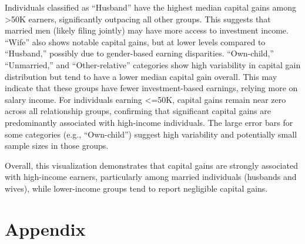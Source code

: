 \documentclass[journal,onecolumn]{IEEEtran}
\begin{document}
Individuals classified as “Husband” have the highest median capital gains among >50K earners, significantly outpacing all other groups. This suggests that married men (likely filing jointly) may have more access to investment income.
“Wife” also shows notable capital gains, but at lower levels compared to “Husband,” possibly due to gender-based earning disparities.
“Own-child,” “Unmarried,” and “Other-relative” categories show high variability in capital gain distribution but tend to have a lower median capital gain overall. This may indicate that these groups have fewer investment-based earnings, relying more on salary income.
For individuals earning <=50K, capital gains remain near zero across all relationship groups, confirming that significant capital gains are predominantly associated with high-income individuals.
The large error bars for some categories (e.g., “Own-child”) suggest high variability and potentially small sample sizes in those groups.

Overall, this visualization demonstrates that capital gains are strongly associated with high-income earners, particularly among married individuals (husbands and wives), while lower-income groups tend to report negligible capital gains.

\section{Appendix}
\end{document}
